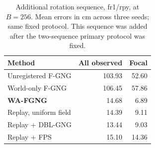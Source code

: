 \begin{table}[t]
\centering\small
\caption{Additional rotation sequence, fr1/rpy, at $B=256$. Mean errors in cm across three seeds; same fixed protocol. This sequence was added after the two-sequence primary protocol was fixed.}
\label{tab:rotation}
\begin{tabular}{lrr}
\toprule Method & All observed & Focal \\
\midrule
Unregistered F-GNG & 103.93 & 52.60 \\
World-only F-GNG & 106.45 & 57.86 \\
\textbf{WA-FGNG} & 14.68 & 6.89 \\
Replay, uniform field & 14.39 & 9.11 \\
Replay + DBL-GNG & 13.44 & 9.03 \\
Replay + FPS & 15.10 & 14.36 \\
\bottomrule\end{tabular}
\end{table}
